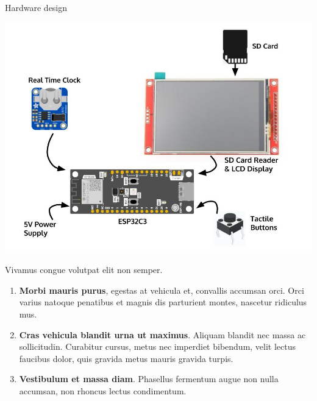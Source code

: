\documentclass[final]{beamer}
\newlength{\colwidth}
\begin{document}
\begin{frame}[t]
\begin{columns}[t]
\begin{column}{\colwidth}
   \begin{block}{Hardware design}
    \begin{center}
      \includegraphics{PrototypeDesign.jpg}
    \end{center}

    Vivamus congue volutpat elit non semper. 

    \begin{enumerate}
      \item \textbf{Morbi mauris purus}, egestas at vehicula et, convallis
        accumsan orci. Orci varius natoque penatibus et magnis dis parturient
        montes, nascetur ridiculus mus.
      \item \textbf{Cras vehicula blandit urna ut maximus}. Aliquam blandit nec
        massa ac sollicitudin. Curabitur cursus, metus nec imperdiet bibendum,
        velit lectus faucibus dolor, quis gravida metus mauris gravida turpis.
      \item \textbf{Vestibulum et massa diam}. Phasellus fermentum augue non
        nulla accumsan, non rhoncus lectus condimentum.
    \end{enumerate}


  \end{block}


\end{column}
\end{columns}
\end{frame}
\end{document}
